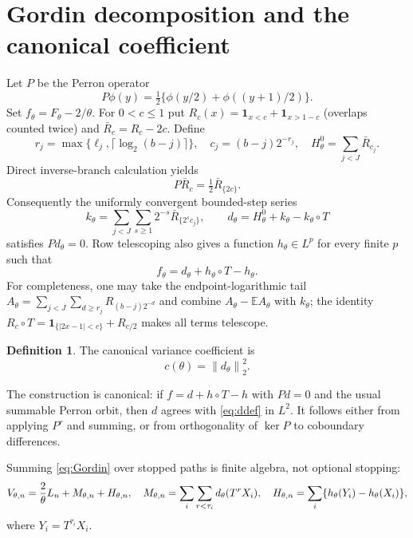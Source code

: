 \documentclass[11pt]{article}
\numberwithin{equation}{section}
\theoremstyle{definition}\newtheorem{definition}[theorem]{Definition}
\theoremstyle{remark}\newtheorem{remark}[theorem]{Remark}
\newcommand{\E}{\mathbb E}\newcommand{\Pp}{\mathbb P}
\newcommand{\1}{\mathbf 1}\newcommand{\cD}{\mathcal D}
\newcommand{\norm}[1]{\left\lVert#1\right\rVert}
\begin{document}
\clearpage
\section{Gordin decomposition and the canonical coefficient}\label{sec:gordin}
Let $P$ be the Perron operator
\begin{equation}P\phi(y)=\tfrac12\{\phi(y/2)+\phi((y+1)/2)\}.   \label{eq:P}
\end{equation}
Set $f_\theta=F_\theta-2/\theta$.  For $0<c\le1$ put
$R_c(x)=\1_{x<c}+\1_{x>1-c}$ (overlaps counted twice) and
$\bar R_c=R_c-2c$.  Define
\begin{equation}
 r_j=\max\{\ell_j,\lceil\log_2(b-j)\rceil\},\quad
 c_j=(b-j)2^{-r_j},\quad H_\theta^0=\sum_{j<J}\bar R_{c_j}.     \label{eq:endpoints}
\end{equation}
Direct inverse-branch calculation yields
\begin{equation}P\bar R_c=\tfrac12\bar R_{\{2c\}}.             \label{eq:PR}
\end{equation}
Consequently the uniformly convergent bounded-step series
\begin{equation}
 k_\theta=\sum_{j<J}\sum_{s\ge1}2^{-s}\bar R_{\{2^sc_j\}},
 \qquad d_\theta=H_\theta^0+k_\theta-k_\theta\circ T           \label{eq:ddef}
\end{equation}
satisfies $Pd_\theta=0$.  Row telescoping also gives a function
$h_\theta\in L^p$ for every finite $p$ such that
\begin{equation}f_\theta=d_\theta+h_\theta\circ T-h_\theta.   \label{eq:Gordin}
\end{equation}
For completeness, one may take the endpoint-logarithmic tail
$A_\theta=\sum_{j<J}\sum_{d\ge r_j}R_{(b-j)2^{-d}}$ and combine
$A_\theta-\E A_\theta$ with $k_\theta$; the identity
$R_c\circ T=\1_{\{|2x-1|<c\}}+R_{c/2}$ makes all terms telescope.

\begin{definition}
The canonical variance coefficient is
\begin{equation}c(\theta)=\norm{d_\theta}_2^2.                  \label{eq:ctheta}
\end{equation}
\end{definition}
The construction is canonical: if $f=d+h\circ T-h$ with $Pd=0$ and the
usual summable Perron orbit, then $d$ agrees with \eqref{eq:ddef} in $L^2$.
It follows either from applying $P^r$ and summing, or from orthogonality of
$\ker P$ to coboundary differences.

Summing \eqref{eq:Gordin} over stopped paths is finite algebra, not optional
stopping:
\begin{equation}
 V_{\theta,n}={2\over\theta}L_n+M_{\theta,n}+H_{\theta,n},
\quad M_{\theta,n}=\sum_i\sum_{r<\tau_i}d_\theta(T^rX_i),
\quad H_{\theta,n}=\sum_i\{h_\theta(Y_i)-h_\theta(X_i)\},       \label{eq:stopped-decomp}
\end{equation}
where $Y_i=T^{\tau_i}X_i$.
\end{document}
